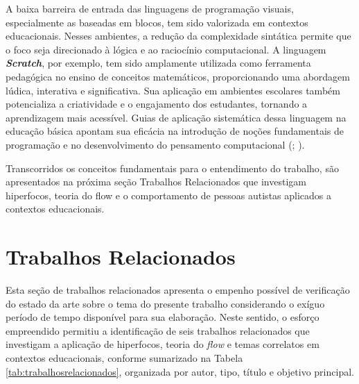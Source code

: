 \documentclass[
  12pt,
  a4paper,
]{article}
\begin{document}
A baixa barreira de entrada das linguagens de programação visuais,
especialmente as baseadas em blocos, tem sido valorizada em contextos
educacionais. Nesses ambientes, a redução da complexidade sintática
permite que o foco seja direcionado à lógica e ao raciocínio
computacional. A linguagem \textbf{\emph{Scratch}}, por exemplo, tem
sido amplamente utilizada como ferramenta pedagógica no ensino de
conceitos matemáticos, proporcionando uma abordagem lúdica, interativa e
significativa. Sua aplicação em ambientes escolares também potencializa
a criatividade e o engajamento dos estudantes, tornando a aprendizagem
mais acessível. Guias de aplicação sistemática dessa linguagem na
educação básica apontam sua eficácia na introdução de noções
fundamentais de programação e no desenvolvimento do pensamento
computacional (;
).

Transcorridos os conceitos fundamentais para o entendimento do trabalho,
são apresentados na próxima seção Trabalhos Relacionados que investigam
hiperfocos, teoria do flow e o comportamento de pessoas autistas
aplicados a contextos educacionais.

\section{Trabalhos Relacionados}\label{trabalhos-relacionados}

Esta seção de trabalhos relacionados apresenta o empenho possível de
verificação do estado da arte sobre o tema do presente trabalho
considerando o exíguo período de tempo disponível para sua elaboração.
Neste sentido, o esforço empreendido permitiu a identificação de seis
trabalhos relacionados que investigam a aplicação de hiperfocos, teoria
do \emph{flow} e temas correlatos em contextos educacionais, conforme
sumarizado na Tabela \ref{tab:trabalhosrelacionados}, organizada por
autor, tipo, título e objetivo principal.

\tiny
\captionsetup{font=normalsize}
\renewcommand{\arraystretch}{1.5}
\end{document}
